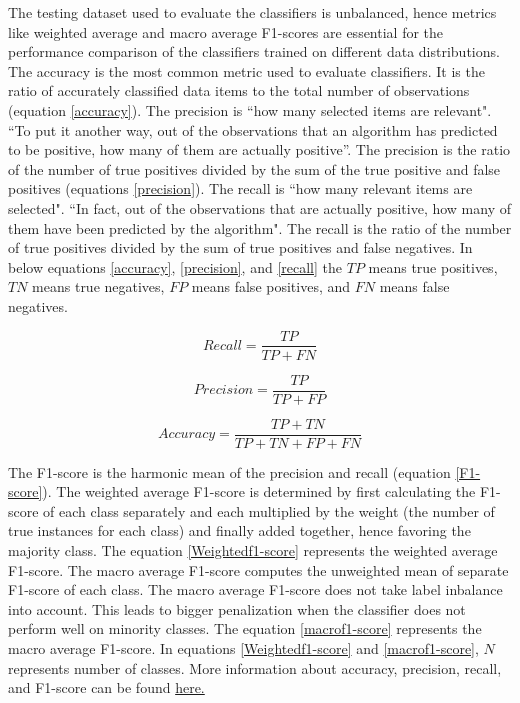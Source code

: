 The testing dataset used to evaluate the classifiers is unbalanced, hence metrics like weighted average and macro average F1-scores are essential for the performance comparison of the classifiers trained on different data distributions. The accuracy is the most common metric used to evaluate classifiers. It is the ratio of accurately classified data items to the total number of observations (equation \ref{accuracy}). The precision is ``how many selected items are relevant"\footnotemark. ``To put it another way, out of the observations that an algorithm has predicted to be positive, how many of them are actually positive''\cite{vakili2020performance}. The precision is the ratio of the number of true positives divided by the sum of the true positive and false positives (equations \ref{precision}). The recall is ``how many relevant items are selected"\footnotemark[\value{footnote}]. ``In fact, out of the observations that are actually positive, how many of them have been predicted by the algorithm"\cite{vakili2020performance}. The recall is the ratio of the number of true positives divided by the sum of true positives and false negatives. In below equations \ref{accuracy}, \ref{precision}, and \ref{recall} the $TP$ means true positives, $TN$ means true negatives, $FP$ means false positives, and $FN$ means false negatives.




\begin{equation}\label{recall}
\textit{Recall} = \frac{TP}{TP + FN}
\end{equation}

\begin{equation}\label{precision}
\textit{Precision} = \frac{TP}{TP + FP}
\end{equation}


\begin{equation}\label{accuracy}
\textit{Accuracy} = \frac{TP + TN}{TP +TN+ FP + FN}
\end{equation}

The F1-score is the harmonic mean of the precision and recall (equation \ref{F1-score}). The weighted average F1-score is determined by first calculating the F1-score of each class separately and each multiplied by the weight (the number of true instances for each class) and finally added together, hence favoring the majority class. The equation \ref{Weightedf1-score} represents the weighted average F1-score. The macro average F1-score computes the unweighted mean of separate F1-score of each class. The macro average F1-score does not take label inbalance into account. This leads to bigger penalization when the classifier does not perform well on minority classes. The equation \ref{macrof1-score} represents the macro average F1-score. In equations \ref{Weightedf1-score} and \ref{macrof1-score}, $N$ represents number of classes. More information about accuracy, precision, recall, and F1-score can be found \href{https://en.wikipedia.org/wiki/Precision_and_recall}{here.}

